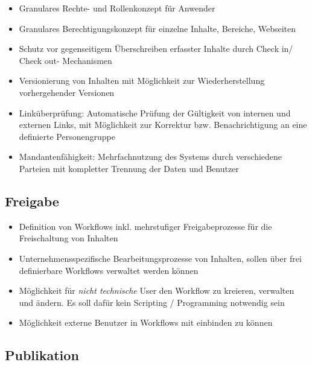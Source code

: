 \begin{itemize}
\item
Granulares Rechte- und Rollenkonzept für Anwender
\item
Granulares Berechtigungskonzept für einzelne Inhalte, Bereiche, Webseiten
\item
Schutz vor gegenseitigem Überschreiben erfasster Inhalte durch Check in/ Check out- Mechanismen
\item
Versionierung von Inhalten mit Möglichkeit zur Wiederherstellung vorhergehender Versionen
\item
Linküberprüfung: Automatische Prüfung der Gültigkeit von internen und externen Links, mit Möglichkeit zur Korrektur bzw. Benachrichtigung an eine definierte Personengruppe
\item
Mandantenfähigkeit: Mehrfachnutzung des Systems durch verschiedene Parteien mit kompletter Trennung der Daten und Benutzer
\end{itemize}


\subsection{Freigabe}

\begin{itemize}
\item
Definition von Workflows inkl. mehrstufiger Freigabeprozesse für die Freischaltung von Inhalten
\item
Unternehmensspezifische Bearbeitungsprozesse von Inhalten, sollen über frei definierbare Workflows verwaltet werden können
\item
Möglichkeit für \emph{nicht technische} User den Workflow zu kreieren, verwalten und ändern. Es soll dafür kein Scripting / Programming notwendig sein
\item
Möglichkeit externe Benutzer in Workflows mit einbinden zu können
\end{itemize}



\subsection{Publikation}

